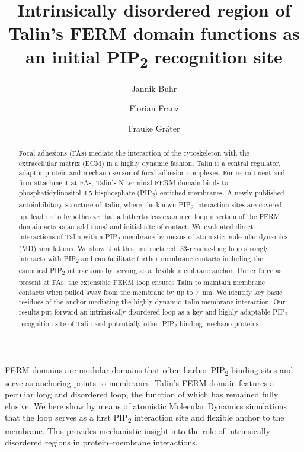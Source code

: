 \documentclass[
  twocolumn]{biophys-new-mod}
\title{Intrinsically disordered region of Talin's FERM domain functions
as an initial PIP\textsubscript{2} recognition site}
\author[1,2,*]
  {Jannik Buhr}
\author[1,2]
  {Florian Franz}
\author[1,2]
  {Frauke Gräter}
\affil[1]{Heidelberg Institute for Theoretical Studies}
\affil[2]{Interdisciplinary Center for Scientific Computing, Heidelberg
University}
\begin{document}
\begin{frontmatter}

\begin{abstract}
Focal adhesions (FAs) mediate the interaction of the cytoskeleton with
the extracellular matrix (ECM) in a highly dynamic fashion. Talin is a
central regulator, adaptor protein and mechano-sensor of focal adhesion
complexes. For recruitment and firm attachment at FAs, Talin's
N-terminal FERM domain binds to phosphatidylinositol 4,5-bisphosphate
(PIP\textsubscript{2})-enriched membranes. A newly published
autoinhibitory structure of Talin, where the known PIP\textsubscript{2}
interaction sites are covered up, lead us to hypothesize that a hitherto
less examined loop insertion of the FERM domain acts as an additional
and initial site of contact. We evaluated direct interactions of Talin
with a PIP\textsubscript{2} membrane by means of atomistic
molecular dynamics (MD) simulations. We show that this unstructured,
33-residue-long loop strongly interacts with PIP\textsubscript{2} and
can facilitate further membrane contacts including the canonical PIP\textsubscript{2} interactions by serving as a flexible membrane
anchor. Under force as present at FAs, the
extensible FERM loop ensures Talin to maintain membrane contacts when
pulled away from the membrane by up to 7~nm. We identify key basic residues of the anchor mediating the highly dynamic Talin-membrane interaction. Our results put
forward an intrinsically disordered loop as a key and highly adaptable
PIP\textsubscript{2} recognition site of Talin and potentially other
PIP\textsubscript{2}-binding mechano-proteins.
\end{abstract}


\begin{sigstatement}
FERM domains are modular domains that often harbor PIP\textsubscript{2}
binding sites and serve as anchoring points to membranes. Talin's FERM
domain features a peculiar long and disordered loop, the function of
which has remained fully elusive. We here show by means of atomistic
Molecular Dynamics simulations that the loop serves as a first
PIP\textsubscript{2} interaction site and flexible anchor to the
membrane. This provides mechanistic insight into the role of
intrinsically disordered regions in protein--membrane interactions.
\end{sigstatement}


\end{frontmatter}\ifdefined\Shaded\renewenvironment{Shaded}{\begin{tcolorbox}[breakable, interior hidden, sharp corners, borderline west={3pt}{0pt}{shadecolor}, enhanced, frame hidden, boxrule=0pt]}{\end{tcolorbox}}\fi
\end{document}
